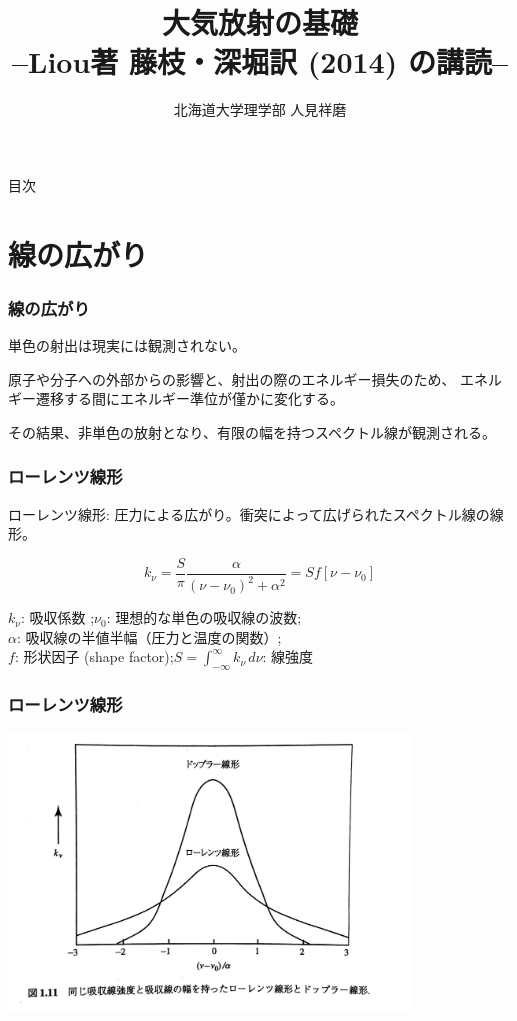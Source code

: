 \documentclass[unicode,colorlinks]{beamer}
\title{大気放射の基礎\\--Liou著 藤枝・深堀訳 (2014) の講読--}
\author{北海道大学理学部 人見祥磨}
\date{\warekitoday}
\newcommand{\centeralign}[1]{\rule{0pt}{0pt}\hfill#1\hfill\rule{0pt}{0pt}}
\begin{document}
\maketitle
\mleftright

\begin{frame}{目次}
	\tableofcontents
\end{frame}

\section{線の広がり}

\begin{frame}
	\frametitle{線の広がり}
	単色の射出は現実には観測されない。

	原子や分子への外部からの影響と、射出の際のエネルギー損失のため、
	エネルギー遷移する間にエネルギー準位が僅かに変化する。

	その結果、非単色の放射となり、有限の幅を持つスペクトル線が観測される。
\end{frame}

\begin{frame}
	\frametitle{ローレンツ線形}
	ローレンツ線形: 圧力による広がり。衝突によって広げられたスペクトル線の線形。

	\[k_\nu=\frac{S}{\pi}\frac{\alpha}{(\nu-\nu_0)^2+\alpha^2}=Sf[\nu-\nu_0]\]

	$k_\nu$: 吸収係数 ;\quad $\nu_0$: 理想的な単色の吸収線の波数;\\
	$\alpha$: 吸収線の半値半幅（圧力と温度の関数）;\\
	$f$: 形状因子 (shape factor);\quad $\displaystyle S=\int^\infty_{-\infty}k_\nu\,d\nu$: 線強度
\end{frame}

\begin{frame}
	\frametitle{ローレンツ線形}
	\centeralign{\includegraphics[width=0.8\textwidth]{lorentz.jpg}}
\end{frame}
\end{document}
